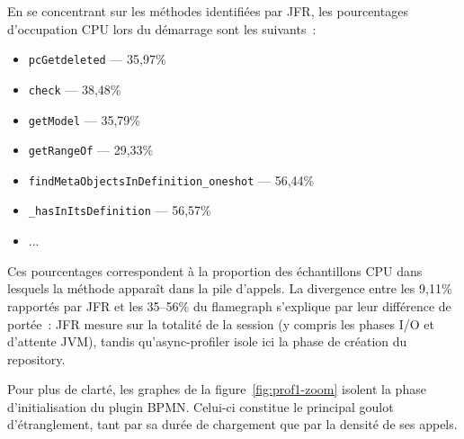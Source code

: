En se concentrant sur les méthodes identifiées par JFR, les pourcentages
d'occupation CPU lors du démarrage sont les suivants~:

\begin{itemize}
    \item \texttt{pcGetdeleted} --- 35,97\%
    \item \texttt{check} --- 38,48\%
    \item \texttt{getModel} --- 35,79\%
    \item \texttt{getRangeOf} --- 29,33\%
    \item \texttt{findMetaObjectsInDefinition\_oneshot} --- 56,44\%
    \item \texttt{\_hasInItsDefinition} --- 56,57\%
    \item ...
\end{itemize}

Ces pourcentages correspondent à la proportion des échantillons CPU dans
lesquels la méthode apparaît dans la pile d'appels. La divergence entre
les 9,11\% rapportés par JFR et les 35--56\% du flamegraph s'explique par
leur différence de portée~: JFR mesure sur la totalité de la session
(y compris les phases I/O et d'attente JVM), tandis qu'async-profiler isole
ici la phase de création du repository.

Pour plus de clarté, les graphes de la figure~\ref{fig:prof1-zoom} isolent la phase d’initialisation du plugin BPMN. Celui-ci constitue le principal goulot d’étranglement, tant par sa durée de chargement que par la densité de ses appels.

